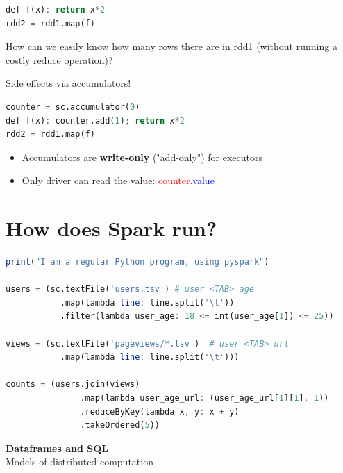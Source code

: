 \documentclass[11pt]{article}
\begin{document}
\begin{minipage}{0.48\textwidth}
\begin{lstlisting}[language=Octave]
def f(x): return x*2
rdd2 = rdd1.map(f)
\end{lstlisting}
How can we easily know how many rows there are in rdd1 (without running a costly reduce operation)?
\end{minipage}
\hfill
\begin{minipage}{0.48\textwidth}
Side effects via accumulators!
\begin{lstlisting}[language=Octave]
counter = sc.accumulator(0)
def f(x): counter.add(1); return x*2
rdd2 = rdd1.map(f)
\end{lstlisting}
\end{minipage}

\begin{itemize}
	\item Accumulators are \textbf{write-only} ("add-only") for executors
	\item Only driver can read the value: \textcolor{red}{counter.}\textcolor{blue}{value}
\end{itemize}

\section*{How does Spark run?}
\begin{lstlisting}[language=Octave]
print("I am a regular Python program, using pyspark")

users = (sc.textFile('users.tsv') # user <TAB> age
           .map(lambda line: line.split('\t'))
           .filter(lambda user_age: 18 <= int(user_age[1]) <= 25))

views = (sc.textFile('pageviews/*.tsv')  # user <TAB> url
           .map(lambda line: line.split('\t')))

counts = (users.join(views)
               .map(lambda user_age_url: (user_age_url[1][1], 1))
               .reduceByKey(lambda x, y: x + y)
               .takeOrdered(5))

\end{lstlisting}

\vspace{0.5cm}

\begin{center}
  {\LARGE \textbf{Dataframes and SQL}} \\
  Models of distributed computation
\end{center}
\vspace{0.5cm}
\end{document}
